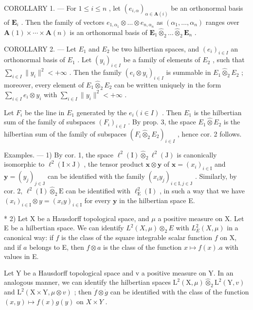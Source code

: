 COROLLARY 1. --- For \(1 \leqslant i \leqslant n\) , let \((e_{i,\alpha})_{\alpha \in \mathbf{A}(i)}\) be an orthonormal basis of \(\mathbf{E}_i\) . Then the family of vectors \(e_{1,\alpha_1} \otimes \ldots \otimes e_{n,\alpha_n}\) as \((\alpha_1, \ldots, \alpha_n)\) ranges over \(\mathbf{A}(1) \times \cdots \times \mathbf{A}(n)\) is an orthonormal basis of \(\mathbf{E}_1 \hat{\otimes}_2 \ldots \hat{\otimes}_2 \mathbf{E}_n\) .

COROLLARY 2. --- Let \(E_{1}\) and \(E_{2}\) be two hilbertian spaces, and \((e_{i})_{i\in I}\) an orthonormal basis of \(E_{1}\) . Let \((y_{i})_{i\in I}\) be a family of elements of \(E_{2}\) , such that \(\sum_{i\in I}\|y_{i}\|^{2}<+\infty\) . Then the family \((e_{i}\otimes y_{i})_{i\in I}\) is summable in \(E_{1}\hat{\otimes}_{2}E_{2}\) ; moreover, every element of \(E_{1}\hat{\otimes}_{2}E_{2}\) can be written uniquely in the form \(\sum_{i\in I}e_{i}\otimes y_{i}\) with \(\sum_{i\in I}\|y_{i}\|^{2}<+\infty\) .

Let \(F_{i}\) be the line in \(E_{1}\) generated by the \(e_{i} (i \in I)\) . Then \(E_{1}\) is the hilbertian sum of the family of subspaces \((F_{i})_{i \in I}\) . By prop. 3, the space \(E_{1} \hat{\otimes} E_{2}\) is the hilbertian sum of the family of subspaces \((F_{i} \hat{\otimes}_{2} E_{2})_{i \in I}\) , hence cor. 2 follows.

Examples. --- 1) By cor. 1, the space \(\ell^2 (\mathrm{I})\hat{\otimes}_2\ell^2 (\mathrm{J})\) is canonically isomorphic to \(\ell^2 (\mathrm{I}\times \mathrm{J})\) , the tensor product \(\mathbf{x}\otimes \mathbf{y}\) of \(\mathbf{x} = (x_i)_{i\in \mathrm{I}}\) and \(\mathbf{y} = (y_j)_{j\in \mathrm{J}}\) can be identified with the family \((x_iy_j)_{i\in \mathrm{I},j\in \mathrm{J}}\) . Similarly, by cor. 2, \(\ell^2 (\mathrm{I})\hat{\otimes}_2\mathrm{E}\) can be identified with \(\ell_{\mathrm{E}}^{2}(\mathrm{I})\) , in such a way that we have \((x_{i})_{i\in \mathrm{I}}\otimes y = (x_{i}y)_{i\in \mathrm{I}}\) for every \(\mathbf{y}\) in the hilbertian space E.

* 2) Let X be a Hausdorff topological space, and \(\mu\) a positive measure on X. Let E be a hilbertian space. We can identify \(L^2(X, \mu) \otimes_2 E\) with \(L_E^2(X, \mu)\) in a canonical way: if \(f\) is the class of the square integrable scalar function \(f\) on X, and if \(a\) belongs to E, then \(f \otimes a\) is the class of the function \(x \mapsto f(x).a\) with values in E.

Let Y be a Hausdorff topological space and v a positive measure on Y. In an analogous manner, we can identify the hilbertian spaces \(\mathrm{L}^{2}(\mathrm{X},\mu)\hat{\otimes}_{2}\mathrm{L}^{2}(\mathrm{Y},v)\) and \(\mathrm{L}^{2}(\mathrm{X}\times\mathrm{Y},\mu\otimes v)\) ; then \(\dot{f}\otimes\dot{g}\) can be identified with the class of the function \((x,y)\mapsto f(x)g(y)\) on \(X\times Y\) .

